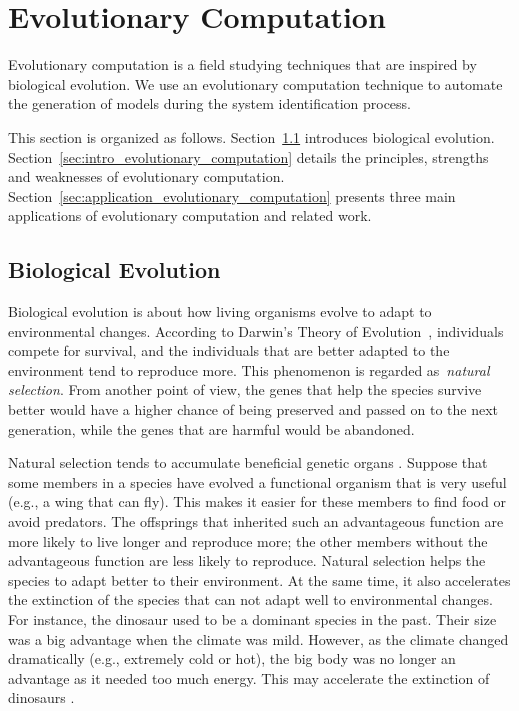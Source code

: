 \section{Evolutionary Computation}\label{sec:evolutionary_computation}

Evolutionary computation is a field studying techniques that are inspired by biological evolution. We use an evolutionary computation technique to automate the generation of models during the system identification process. 

This section is organized as follows. Section~\ref{sec:natural_evolution} introduces biological evolution. Section~\ref{sec:intro_evolutionary_computation} details the principles, strengths and weaknesses of evolutionary computation. Section~\ref{sec:application_evolutionary_computation} presents three main applications of evolutionary computation and related work.

\subsection{Biological Evolution}\label{sec:natural_evolution}

Biological evolution is about how living organisms evolve to adapt to environmental changes. According to Darwin's Theory of Evolution~\cite{Darwin_1859}, individuals compete for survival, and the individuals that are better adapted to the environment tend to reproduce more. This phenomenon is regarded as~\textit{natural selection}. From another point of view, the genes that help the species survive better would have a higher chance of being preserved and passed on to the next generation, while the genes that are harmful would be abandoned. 

Natural selection tends to accumulate beneficial genetic organs \cite{Desai2007}. Suppose that some members in a species have evolved a functional organism that is very useful (e.g., a wing that can fly). This makes it easier for these members to find food or avoid predators. The offsprings that inherited such an advantageous function are more likely to live longer and reproduce more; the other members without the advantageous function are less likely to reproduce. Natural selection helps the species to adapt better to their environment. At the same time, it also accelerates the extinction of the species that can not adapt well to environmental changes. For instance, the dinosaur used to be a dominant species in the past. Their size was a big advantage when the climate was mild. However, as the climate changed dramatically (e.g., extremely cold or hot), the big body was no longer an advantage as it needed too much energy. This may accelerate the extinction of dinosaurs \cite{Russell1965}. 

